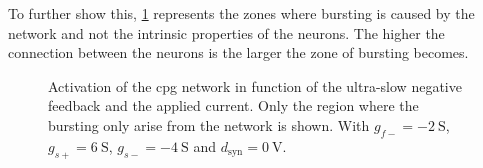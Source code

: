 To further show this, \cref{fig:cpg_only_act} represents the zones where bursting is caused by the network and not the intrinsic properties of the neurons. The higher the connection between the neurons is the larger the zone of bursting becomes.

\begin{figure}[!htb]
    \centering
    \caption{Activation of the cpg network in function of the ultra-slow negative feedback and the applied current. Only the region where the bursting only arise from the network is shown. With $g_{f-}=\qty{-2}{\siemens}$, $g_{s+}=\qty{6}{\siemens}$, $g_{s-}=\qty{-4}{\siemens}$ and $d_\text{syn} = \qty{0}{\volt}$.}
    \label{fig:cpg_only_act}
\end{figure}
